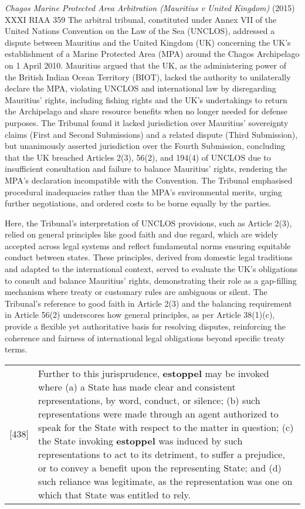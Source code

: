 \begin{casedetails}{\textit{Chagos Marine Protected Area Arbitration (Mauritius v United Kingdom)} (2015) XXXI RIAA 359}
    \flushleft
    The arbitral tribunal, constituted under Annex VII of the United Nations Convention on the Law of the Sea (UNCLOS), addressed a dispute between Mauritius and the United Kingdom (UK) concerning the UK's establishment of a Marine Protected Area (MPA) around the Chagos Archipelago on 1 April 2010. Mauritius argued that the UK, as the administering power of the British Indian Ocean Territory (BIOT), lacked the authority to unilaterally declare the MPA, violating UNCLOS and international law by disregarding Mauritius' rights, including fishing rights and the UK's undertakings to return the Archipelago and share resource benefits when no longer needed for defense purposes. The Tribunal found it lacked jurisdiction over Mauritius' sovereignty claims (First and Second Submissions) and a related dispute (Third Submission), but unanimously asserted jurisdiction over the Fourth Submission, concluding that the UK breached Articles 2(3), 56(2), and 194(4) of UNCLOS due to insufficient consultation and failure to balance Mauritius' rights, rendering the MPA's declaration incompatible with the Convention. The Tribunal emphasised procedural inadequacies rather than the MPA's environmental merits, urging further negotiations, and ordered costs to be borne equally by the parties.

    \vspace{\baselineskip}

    Here, the Tribunal's interpretation of UNCLOS provisions, such as Article 2(3), relied on general principles like good faith and due regard, which are widely accepted across legal systems and reflect fundamental norms ensuring equitable conduct between states. These principles, derived from domestic legal traditions and adapted to the international context, served to evaluate the UK's obligations to consult and balance Mauritius' rights, demonstrating their role as a gap-filling mechanism where treaty or customary rules are ambiguous or silent. The Tribunal's reference to good faith in Article 2(3) and the balancing requirement in Article 56(2) underscores how general principles, as per Article 38(1)(c), provide a flexible yet authoritative basis for resolving disputes, reinforcing the coherence and fairness of international legal obligations beyond specific treaty terms.

    \begin{longtable}{r|>{\raggedright\arraybackslash}p{}}
        [438] & Further to this jurisprudence, \textbf{estoppel} may be invoked where (a) a State has made clear and consistent representations, by word, conduct, or silence; (b) such representations were made through an agent authorized to speak for the State with respect to the matter in question; (c) the State invoking \textbf{estoppel} was induced by such representations to act to its detriment, to suffer a prejudice, or to convey a benefit upon the representing State; and (d) such reliance was legitimate, as the representation was one on which that State was entitled to rely.
    \end{longtable}  


\end{casedetails}
